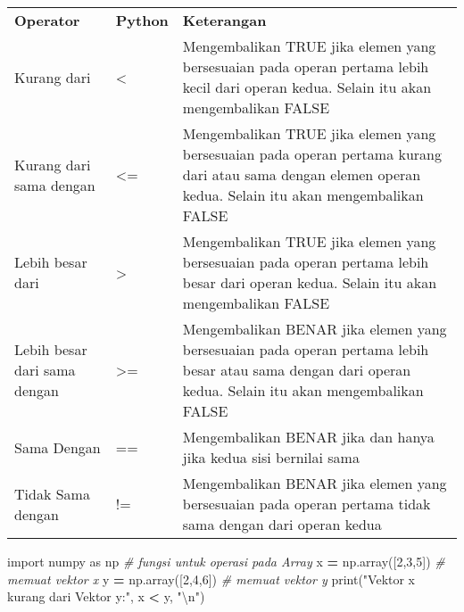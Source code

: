 \documentclass[
]{docs}
\newenvironment{Shaded}{\begin{snugshade}}{\end{snugshade}}
\newcommand{\BuiltInTok}[1]{#1}
\newcommand{\CharTok}[1]{\textcolor[rgb]{0.31,0.60,0.02}{#1}}
\newcommand{\CommentTok}[1]{\textcolor[rgb]{0.56,0.35,0.01}{\textit{#1}}}
\newcommand{\DecValTok}[1]{\textcolor[rgb]{0.00,0.00,0.81}{#1}}
\newcommand{\ImportTok}[1]{#1}
\newcommand{\NormalTok}[1]{#1}
\newcommand{\OperatorTok}[1]{\textcolor[rgb]{0.81,0.36,0.00}{\textbf{#1}}}
\newcommand{\StringTok}[1]{\textcolor[rgb]{0.31,0.60,0.02}{#1}}
\begin{document}
\begin{longtable}[]{@{}
  >{\centering\arraybackslash}p{}
  >{\centering\arraybackslash}p{}
  >{\centering\arraybackslash}p{}@{}}
\toprule()
\endhead
\textbf{Operator} & \textbf{Python} & \textbf{Keterangan} \\
Kurang dari & \textless{} & Mengembalikan TRUE jika elemen yang bersesuaian pada operan pertama lebih kecil dari operan kedua. Selain itu akan mengembalikan FALSE \\
Kurang dari sama dengan & \textless= & Mengembalikan TRUE jika elemen yang bersesuaian pada operan pertama kurang dari atau sama dengan elemen operan kedua. Selain itu akan mengembalikan FALSE \\
Lebih besar dari & \textgreater{} & Mengembalikan TRUE jika elemen yang bersesuaian pada operan pertama lebih besar dari operan kedua. Selain itu akan mengembalikan FALSE \\
Lebih besar dari sama dengan & \textgreater= & Mengembalikan BENAR jika elemen yang bersesuaian pada operan pertama lebih besar atau sama dengan dari operan kedua. Selain itu akan mengembalikan FALSE \\
Sama Dengan & == & Mengembalikan BENAR jika dan hanya jika kedua sisi bernilai sama \\
Tidak Sama dengan & != & Mengembalikan BENAR jika elemen yang bersesuaian pada operan pertama tidak sama dengan dari operan kedua \\
\bottomrule()
\end{longtable}

\begin{Shaded}
\begin{Highlighting}[]
\ImportTok{import}\NormalTok{ numpy }\ImportTok{as}\NormalTok{ np    }\CommentTok{\# fungsi untuk operasi pada Array}
\NormalTok{x }\OperatorTok{=}\NormalTok{ np.array([}\DecValTok{2}\NormalTok{,}\DecValTok{3}\NormalTok{,}\DecValTok{5}\NormalTok{]) }\CommentTok{\# memuat vektor x}
\NormalTok{y }\OperatorTok{=}\NormalTok{ np.array([}\DecValTok{2}\NormalTok{,}\DecValTok{4}\NormalTok{,}\DecValTok{6}\NormalTok{]) }\CommentTok{\# memuat vektor y}
\BuiltInTok{print}\NormalTok{(}\StringTok{"Vektor x  kurang dari Vektor y:"}\NormalTok{, x }\OperatorTok{\textless{}}\NormalTok{ y, }\StringTok{"}\CharTok{\textbackslash{}n}\StringTok{"}\NormalTok{)}
\end{Highlighting}
\end{Shaded}
\end{document}
